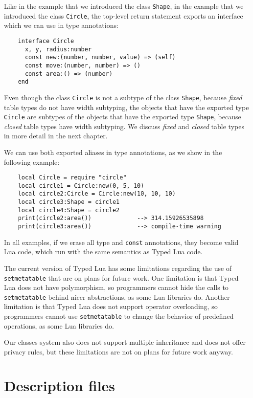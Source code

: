 Like in the example that we introduced the class \texttt{Shape},
in the example that we introduced the class \texttt{Circle},
the top-level return statement exports an
interface which we can use in type annotations:
\begin{verbatim}
    interface Circle
      x, y, radius:number
      const new:(number, number, value) => (self)
      const move:(number, number) => ()
      const area:() => (number)
    end
\end{verbatim}

Even though the class \texttt{Circle} is not a subtype of the
class \texttt{Shape}, because \emph{fixed} table types do not
have width subtyping, the objects that have the exported type
\texttt{Circle} are subtypes of the objects that have the
exported type \texttt{Shape}, because \emph{closed} table types
have width subtyping.
We discuss \emph{fixed} and \emph{closed} table types in more
detail in the next chapter.

We can use both exported aliases in type annotations, as we
show in the following example:
\begin{verbatim}
    local Circle = require "circle"
    local circle1 = Circle:new(0, 5, 10)
    local circle2:Circle = Circle:new(10, 10, 10)
    local circle3:Shape = circle1
    local circle4:Shape = circle2
    print(circle2:area())             --> 314.15926535898
    print(circle3:area())             --> compile-time warning
\end{verbatim}

In all examples, if we erase all type and \texttt{const} annotations,
they become valid Lua code, which run with the same semantics as Typed Lua code.

The current version of Typed Lua has some limitations regarding
the use of \texttt{setmetatable} that are on plans for future work.
One limitation is that Typed Lua does not have polymorphism,
so programmers cannot hide the calls to \texttt{setmetatable} behind
nicer abstractions, as some Lua libraries do.
Another limitation is that Typed Lua does not support operator overloading,
so programmers cannot use \texttt{setmetatable} to change the behavior
of predefined operations, as some Lua libraries do.

Our classes system also does not support multiple inheritance
and does not offer privacy rules, but these limitations are not
on plans for future work anyway.

\section{Description files}
\label{sec:tld}

